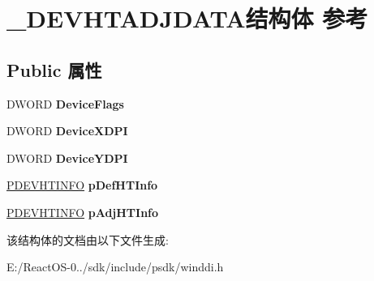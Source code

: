 \hypertarget{struct___d_e_v_h_t_a_d_j_d_a_t_a}{}\section{\+\_\+\+D\+E\+V\+H\+T\+A\+D\+J\+D\+A\+T\+A结构体 参考}
\label{struct___d_e_v_h_t_a_d_j_d_a_t_a}
\subsection*{Public 属性}
\begin{DoxyCompactItemize}
\item 
\mbox{\label{struct___d_e_v_h_t_a_d_j_d_a_t_a_a464855dc70a1936dd103ba5e5ddb1a0f}} 
D\+W\+O\+RD {\bfseries Device\+Flags}
\item 
\mbox{\label{struct___d_e_v_h_t_a_d_j_d_a_t_a_a10064a4cb04635b8cf9587b53ff649e3}} 
D\+W\+O\+RD {\bfseries Device\+X\+D\+PI}
\item 
\mbox{\label{struct___d_e_v_h_t_a_d_j_d_a_t_a_a7a4b4ac03a7be4af4634e2663d4499c6}} 
D\+W\+O\+RD {\bfseries Device\+Y\+D\+PI}
\item 
\mbox{\label{struct___d_e_v_h_t_a_d_j_d_a_t_a_a3c916489b38ef8f3f0e507701999420f}} 
\hyperlink{struct___d_e_v_h_t_i_n_f_o}{P\+D\+E\+V\+H\+T\+I\+N\+FO} {\bfseries p\+Def\+H\+T\+Info}
\item 
\mbox{\label{struct___d_e_v_h_t_a_d_j_d_a_t_a_acaa08ee01f1ad0a569f8e10672ab69f7}} 
\hyperlink{struct___d_e_v_h_t_i_n_f_o}{P\+D\+E\+V\+H\+T\+I\+N\+FO} {\bfseries p\+Adj\+H\+T\+Info}
\end{DoxyCompactItemize}


该结构体的文档由以下文件生成\+:\begin{DoxyCompactItemize}
\item 
E\+:/\+React\+O\+S-\/0../sdk/include/psdk/winddi.\+h\end{DoxyCompactItemize}
